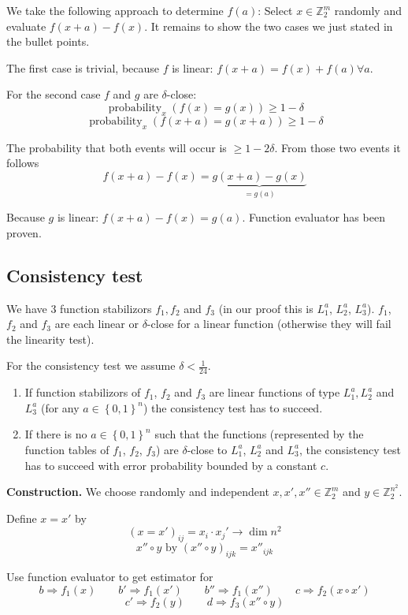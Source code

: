 \documentclass[a4paper]{article}
\newcommand{\set}[1]{\left\{#1\right\}}
\DeclareMathOperator{\prop}{probability}
\begin{document}
We take the following approach to determine $f(a)$:
Select $x \in \mathbb{Z}_2^m$ randomly and evaluate
$f(x + a) - f(x)$. It remains to show the two cases
we just stated in the bullet points.

The first case is trivial, because $f$ is linear:
$f(x + a) = f(x) + f(a) \forall a$.

For the second case $f$ and $g$ are $\delta$-close:
\[
  \prop_x(f(x) = g(x)) \geq 1 - \delta
\] \[
  \prop_x(f(x + a) = g(x + a)) \geq 1 - \delta
\]

The probability that both events will occur is
$\geq 1 - 2\delta$. From those two events it follows
\[
  f(x + a) - f(x) = \underbrace{g(x + a) - g(x)}_{=g(a)}
\]

Because $g$ is linear: $f(x + a) - f(x) = g(a)$.
Function evaluator has been proven.

\subsection{Consistency test}
%
We have 3 function stabilizors $f_1, f_2$ and $f_3$
(in our proof this is $L_1^a$, $L_2^a$, $L_3^a$).
$f_1$, $f_2$ and $f_3$ are each linear or $\delta$-close
for a linear function (otherwise they will fail the linearity
test).

For the consistency test we assume $\delta < \frac1{24}$.
\begin{enumerate}
  \item
    If function stabilizors of $f_1$, $f_2$ and $f_3$
    are linear functions of type $L_1^a, L_2^a$ and $L_3^a$
    (for any $a \in \set{0,1}^n$) the consistency test
    has to succeed.
  \item
    If there is no $a \in \set{0,1}^n$ such that the
    functions (represented by the function tables of
    $f_1$, $f_2$, $f_3$) are $\delta$-close to $L_1^a$,
    $L_2^a$ and $L_3^a$, the consistency test has to succeed
    with error probability bounded by a constant $c$.
\end{enumerate}

\textbf{Construction.}
We choose randomly and independent $x, x', x'' \in \mathbb{Z}_2^m$
and $y \in \mathbb{Z}_2^{n^2}$.

Define $x = x'$ by
\[
  (x = x')_{ij} = x_i \cdot x_j' \rightarrow \dim{n^2}
\] \[
  x'' \circ y \text{ by } (x'' \circ y)_{ijk} = x''_{ijk}
\]

Use function evaluator to get estimator for
\[
  b \Rightarrow f_1(x) \qquad 
  b' \Rightarrow f_1(x') \qquad 
  b'' \Rightarrow f_1(x'') \qquad 
  c \Rightarrow f_2(x \circ x')
\] \[
  c' \Rightarrow f_2(y) \qquad 
  d \Rightarrow f_3(x'' \circ y)
\]
\end{document}
